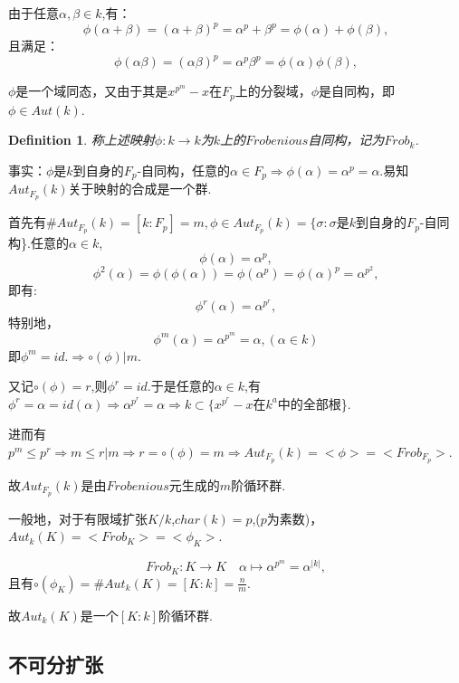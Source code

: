 \documentclass[UTF8]{article}
\newtheorem{defn}{Definition}[section]
\begin{document}
由于任意$\alpha,\beta\in k$,有：
$$\phi(\alpha+\beta)=(\alpha+\beta)^p=\alpha^p + \beta^p=\phi(\alpha) +\phi(\beta),$$
且满足：
$$\phi(\alpha\beta)=(\alpha\beta)^p=\alpha^p\beta^p=\phi(\alpha)\phi(\beta),$$

$\phi$是一个域同态，又由于其是$x^{p^m}-x$在$F_p$上的分裂域，$\phi$是自同构，即$\phi\in Aut(k)$.

\begin{defn}
称上述映射$\phi:k\rightarrow k$为$k$上的$Frobenious$自同构，记为$Frob_k$.
\end{defn}
事实：$\phi$是$k$到自身的$F_p$-自同构，任意的$\alpha\in F_p\Rightarrow\phi(\alpha)=\alpha^p=\alpha$.易知$Aut_{F_p}(k)$关于映射的合成是一个群.

首先有$\# Aut_{F_p}(k)=[k:F_p]=m,\phi\in Aut_{F_p}(k)=\{\sigma:\sigma$是$k$到自身的$F_p$-自同构\}.任意的$\alpha\in k$,$$\phi(\alpha)=\alpha^p,$$
$$\phi^2(\alpha)=\phi(\phi(\alpha))=\phi(\alpha^p)=\phi(\alpha)^p=\alpha^{p^2},$$即有:
$$\phi^r(\alpha)=\alpha^{p^r},$$特别地，$$\phi^m(\alpha)=\alpha^{p^m}=\alpha,(\alpha\in k)$$即$\phi^m=id.\Rightarrow \circ(\phi)|m$.

又记$\circ(\phi)=r$,则$\phi^r=id$.于是任意的$\alpha\in k$,有$\phi^r=\alpha=id(\alpha)\Rightarrow \alpha^{p^r}=\alpha\Rightarrow k\subset\{x^{p^r}-x$在$k^a$中的全部根\}.

进而有$p^m\le p^r\Rightarrow m\le r|m\Rightarrow r=\circ(\phi)=m\Rightarrow Aut_{F_p}(k)=<\phi>=<Frob_{F_p}>$.

故$Aut_{F_p}(k)$是由$Frobenious$元生成的$m$阶循环群.

一般地，对于有限域扩张$K/k$,$char(k)=p$,($p$为素数)，$Aut_k(K)=<Frob_K>=<\phi_K>$.

$$Frob_K:K\rightarrow K\quad \alpha\mapsto \alpha^{p^m}=\alpha^{|k|},$$且有$\circ(\phi_K)=\#Aut_k(K)=[K:k]=\frac{n}{m}$.

故$Aut_k(K)$是一个$[K:k]$阶循环群.


	\subsection{不可分扩张}
\end{document}
